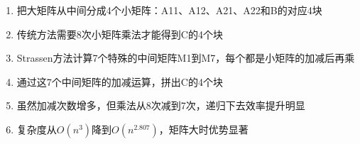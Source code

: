\begin{enumerate}
    \item 把大矩阵从中间分成4个小矩阵：A11、A12、A21、A22和B的对应4块
    \item 传统方法需要8次小矩阵乘法才能得到C的4个块
    \item Strassen方法计算7个特殊的中间矩阵M1到M7，每个都是小矩阵的加减后再乘
    \item 通过这7个中间矩阵的加减运算，拼出C的4个块
    \item 虽然加减次数增多，但乘法从8次减到7次，递归下去效率提升明显
    \item 复杂度从$O(n^3)$降到$O(n^{2.807})$，矩阵大时优势显著
\end{enumerate}
